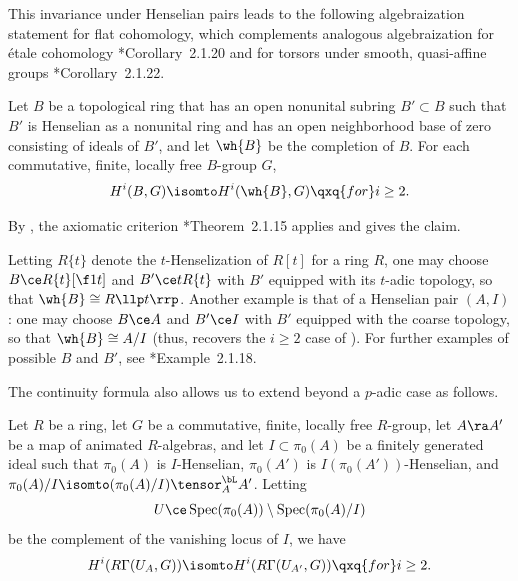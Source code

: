 This invariance under Henselian pairs leads to the following algebraization statement for flat cohomology, which complements analogous algebraization for \'{e}tale cohomology \cite{BC19}*{Corollary~2.1.20} and for torsors under smooth, quasi-affine groups \cite{BC19}*{Corollary~2.1.22}.

\bcor \label{cor:algebraization}
Let $B$ be a topological ring that has an open nonunital subring $B' \subset B$ such that $B'$ is Henselian as a nonunital ring and has an open neighborhood base of zero consisting of ideals of $B'$, and let $\wh{B}$ be the completion of $B$. For each commutative, finite, locally free $B$-group $G$,
\[
H^i(B, G) \isomto H^i(\wh{B}, G) \qxq{for} i \ge 2.
\]
\ecor


\bpf
By , the axiomatic criterion \cite{BC19}*{Theorem~2.1.15} applies and gives the claim.
\epf



\beg
Letting $R\{t\}$ denote the $t$-Henselization of $R[t]$ for a ring $R$, one may choose $B \ce R\{t\}[\f 1t]$ and $B' \ce tR\{t\}$ with $B'$ equipped with its $t$-adic topology, so that $\wh{B} \cong R\llp t \rrp$. Another example is that of a Henselian pair $(A, I)$: one may choose $B \ce A$ and $B' \ce I$ with $B'$ equipped with the coarse topology, so that $\wh{B} \cong A/I$ (thus,  recovers the $i \ge 2$ case of ). For further examples of possible $B$ and $B'$, see \cite{BC19}*{Example~2.1.18}.
\eeg










The continuity formula also allows us to extend  beyond a $p$-adic case as follows.

\bcor \label{cor:more-algebrization}
Let $R$ be a ring, let $G$ be a commutative, finite, locally free $R$-group, let $A \ra A'$ be a map  of animated $R$-algebras, and let $I \subset \pi_0(A)$ be a finitely generated ideal such that $\pi_0(A)$ is $I$-Henselian, $\pi_0(A')$ is $I(\pi_0(A'))$-Henselian, and $\pi_0(A)/I \isomto (\pi_0(A)/I) \tensor^\bL_A A'$. Letting
\[
U \ce \Spec(\pi_0(A)) \setminus \Spec(\pi_0(A)/I)
\]
be the complement of the vanishing locus of $I$, we have
\[
H^i(R\Gamma(U_A, G)) \isomto H^i(R\Gamma(U_{A'}, G)) \qxq{for} i \ge 2. %
\]
\ecor

